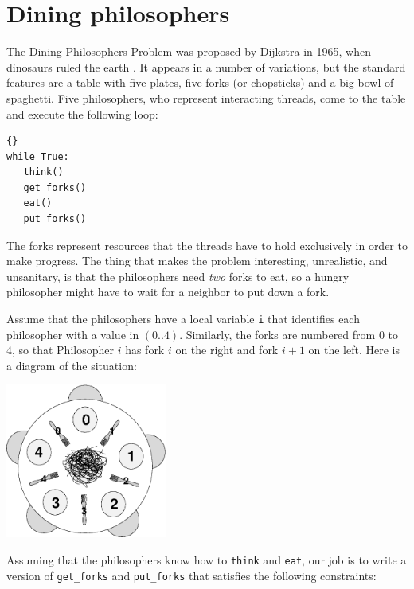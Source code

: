 \documentclass{book}
\newcommand{\clearemptydoublepage}{\newpage\cleardoublepage}
\begin{document}
\clearemptydoublepage
\section{Dining philosophers}
\label{dining}

The Dining Philosophers Problem was proposed by Dijkstra in
1965, when dinosaurs ruled the earth \cite{dijkstra65}.  It
appears in a number of variations, but the standard features
are a table with five plates, five forks (or chopsticks) and
a big bowl of spaghetti.  Five philosophers, who represent
interacting threads, come to the table and execute the
following loop:

\begin{latin}
\begin{latin}
\begin{lstlisting}[title={Basic philosopher loop}]{}
while True:
   think()
   get_forks()
   eat()
   put_forks()
\end{lstlisting}
\end{latin}
\end{latin}

The forks represent resources that the threads have to hold
exclusively in order to make progress.  The thing that makes the
problem interesting, unrealistic, and unsanitary, is that the
philosophers need {\em two} forks to eat, so a hungry philosopher
might have to wait for a neighbor to put down a fork.

Assume that the philosophers have a local variable {\tt i} that
identifies each philosopher with a value in $(0..4)$.  Similarly,
the forks are numbered from 0 to 4, so that Philosopher $i$ has
fork $i$ on the right and fork $i+1$ on
the left.  Here is a diagram of the situation:

\centerline{\includegraphics[height=2in]{table.eps}}

Assuming that the philosophers know how to {\tt think} and {\tt eat},
our job is to write a version of {\tt get\_forks} and {\tt put\_forks}
that satisfies the following constraints:
\end{document}
